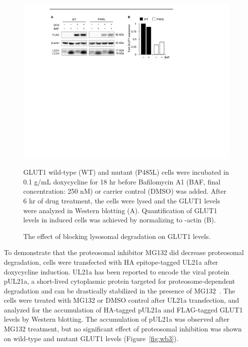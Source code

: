 \begin{figure}[h]
\centering
\includegraphics[scale=0.7]{Figures/wb2}
\caption{The effect of blocking lysosomal degradation on GLUT1 levels.}
\vspace*{-3mm}
\small \justify
GLUT1 wild-type (WT) and mutant (P485L) cells were incubated in 0.1 \textmu g/mL doxycycline for 18 hr before Bafilomycin A1 (BAF, final concentration: 250 nM) or carrier control (DMSO) was added. After 6 hr of drug treatment, the cells were lysed and the GLUT1 levels were analyzed in Western blotting (A). Quantification of GLUT1 levels in induced cells was achieved by normalizing to \textbeta -actin (B).
\label{fig:wb2}
\end{figure}
To demonstrate that the proteosomal inhibitor MG132 did decrease proteosomal degradation, cells were transfected with HA epitope-tagged UL21a after doxycycline induction. UL21a has been reported to encode the viral protein pUL21a, a short-lived cytoplasmic protein targeted for proteosome-dependent degradation and can be drastically stabilized in the presence of MG132~\cite{Fehr}. The cells were treated with MG132 or DMSO control after UL21a transfection, and analyzed for the accumulation of HA-tagged pUL21a and FLAG-tagged GLUT1 levels by Western blotting. The accumulation of pUL21a was observed after MG132 treatment, but no significant effect of proteosomal inhibition was shown on wild-type and mutant GLUT1 levels (Figure~\ref{fig:wb3}).

